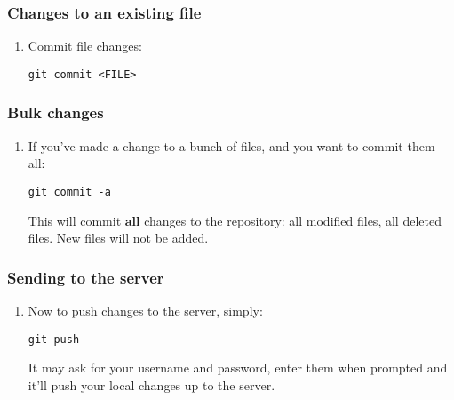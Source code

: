 \documentclass{article}
\begin{document}
\subsubsection*{Changes to an existing file}
\begin{enumerate}
	\item Commit file changes:
	
	\texttt{git commit <FILE>}
\end{enumerate}

\subsubsection*{Bulk changes}
\begin{enumerate}
	\item If you've made a change to a bunch of files, and you want to commit them all:
	
	\texttt{git commit -a}
	
	This will commit \textbf{all} changes to the repository: all modified files, all deleted files. New files will not be added. 
\end{enumerate}

\subsubsection*{Sending to the server}
\begin{enumerate}
	\item Now to push changes to the server, simply:
	
	\texttt{git push}
	
	It may ask for your username and password, enter them when prompted and it'll push your local changes up to the server.
		
\end{enumerate}
\end{document}
